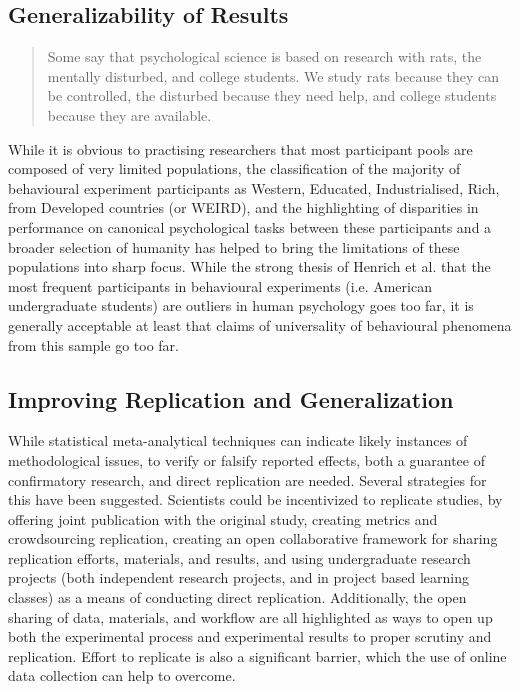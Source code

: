 \documentclass[12pt,a4paper,titlepage]{scrreprt}
\begin{document}
\subsection{Generalizability of Results}
\begin{quote}Some say that psychological science is based on research with rats, the mentally disturbed, and college students. We study rats because they can be controlled, the disturbed because they need help, and college students because they are available.\cite{birnbaum_psychological_2000}
\end{quote}
While it is obvious to practising researchers that most participant pools are composed of very limited populations\cite{buchanan_using_1999,birnbaum_psychological_2000,kraut_psychological_2004,birnbaum_human_2004,buhrmester_amazons_2011}, the classification of the majority of behavioural experiment participants as Western, Educated, Industrialised, Rich, from Developed countries (or WEIRD), and the highlighting of disparities in performance on canonical psychological tasks between these participants and a broader selection of humanity \cite{henrich_beyond_2010} has helped to bring the limitations of these populations into sharp focus. While the strong thesis of Henrich et al. that the most frequent participants in behavioural experiments (i.e. American undergraduate students) are outliers in human psychology goes too far\cite{bennis_weirdness_2010}, it is generally acceptable at least that claims of universality of behavioural phenomena from this sample go too far\cite{baumard_weird_2010,ceci_weird_2010,konecni_responsible_2010}.
\subsection{Improving Replication and Generalization}
While statistical meta-analytical techniques can indicate likely instances of methodological issues, to verify or falsify reported effects, both a guarantee of confirmatory research, and direct replication are needed. Several strategies for this have been suggested. Scientists could be incentivized to replicate studies, by offering joint publication with the original study\cite{koole_rewarding_2012}, creating metrics and crowdsourcing replication\cite{nosek_scientific_2012}, creating an open collaborative framework for sharing replication efforts, materials, and results\cite{collaboration_open_2012}, and using undergraduate research projects (both independent research projects, and in project based learning classes) as a means of conducting direct replication\cite{grahe_harnessing_2012,frank_teaching_2012}. Additionally, the open sharing of data, materials, and workflow\cite{giner-sorolla_science_2012,nosek_scientific_2012,miguel_promoting_2014} are all highlighted as ways to open up both the experimental process and experimental results to proper scrutiny and replication. Effort to replicate is also a significant barrier, which the use of online data collection can help to overcome\cite{grahe_harnessing_2012}.
\end{document}
